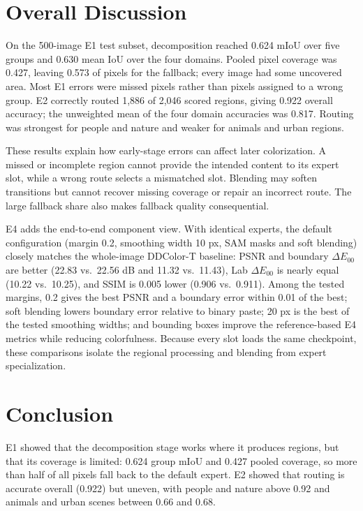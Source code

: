 \documentclass{FastFyp}
\begin{document}
\section{Overall Discussion}
\label{sec:overall-discussion}

On the 500-image E1 test subset, decomposition reached 0.624 mIoU over five
groups and 0.630 mean IoU over the four domains. Pooled pixel coverage was
0.427, leaving 0.573 of pixels for the fallback; every image had some
uncovered area. Most E1 errors were missed pixels rather than pixels assigned
to a wrong group. E2 correctly routed 1,886 of 2,046 scored regions, giving
0.922 overall accuracy; the unweighted mean of the four domain accuracies was
0.817. Routing was strongest for people and nature and weaker for animals and
urban regions.

These results explain how early-stage errors can affect later colorization.
A missed or incomplete region cannot provide the intended content to its
expert slot, while a wrong route selects a mismatched slot. Blending may
soften transitions but cannot recover missing coverage or repair an incorrect
route. The large fallback share also makes fallback quality consequential.

E4 adds the end-to-end component view. With identical experts, the default
configuration (margin 0.2, smoothing width 10 px, SAM masks and soft blending)
closely matches the whole-image DDColor-T baseline: PSNR and boundary
$\Delta E_{00}$ are better (22.83 vs.\ 22.56 dB and 11.32 vs.\ 11.43), Lab
$\Delta E_{00}$ is nearly equal (10.22 vs.\ 10.25), and SSIM is 0.005 lower
(0.906 vs.\ 0.911). Among the tested margins, 0.2 gives the best PSNR and a
boundary error within 0.01 of the best; soft blending lowers boundary error
relative to binary paste; 20 px is the best of the tested smoothing widths;
and bounding boxes improve the reference-based E4 metrics while reducing colorfulness. Because
every slot loads the same checkpoint, these comparisons isolate the regional
processing and blending from expert specialization.

\section{Conclusion}
\label{sec:results-conclusion}

E1 showed that the decomposition stage works where it produces regions, but
that its coverage is limited: 0.624 group mIoU and 0.427 pooled coverage, so
more than half of all pixels fall back to the default expert. E2 showed that
routing is accurate overall (0.922) but uneven, with people and nature above
0.92 and animals and urban scenes between 0.66 and 0.68.
\end{document}

